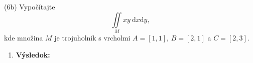 \pr (6b) Vypočítajte $$\displaystyle \iint\limits_{M}{xy} \ \mathrm{d}x \mathrm{d}y,$$ kde množina $M$ je trojuholník s vrcholmi $A=[1,1]$, $B=[2,1]$ a $C=[2,3]$.

\begin{enumerate}
\item[]\textbf{Výsledok:}\gr
\end{enumerate}
